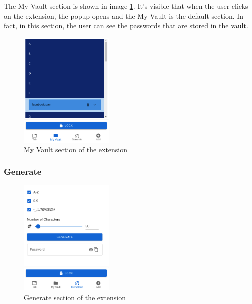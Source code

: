 The My Vault section is shown in image \ref{fig:my-vault}. It's visible that when the user clicks on the extension, the popup opens and the My Vault is the default section. In fact, in this section, the user can see the passwords that are stored in the vault.
\begin{figure}[h!]
    \centering
    \vspace{0.5cm}
    \includegraphics[width=0.4\textwidth]{images/extension/my-vault.png}
    \caption{My Vault section of the extension}
    \label{fig:my-vault} %
\end{figure}

\subsubsection{Generate}

\begin{figure}[h!]
    \centering
    \vspace{0.5cm}
    \includegraphics[width=0.4\textwidth]{images/extension/generate.png}
    \caption{Generate section of the extension}
    \label{fig:generate} %
\end{figure}

